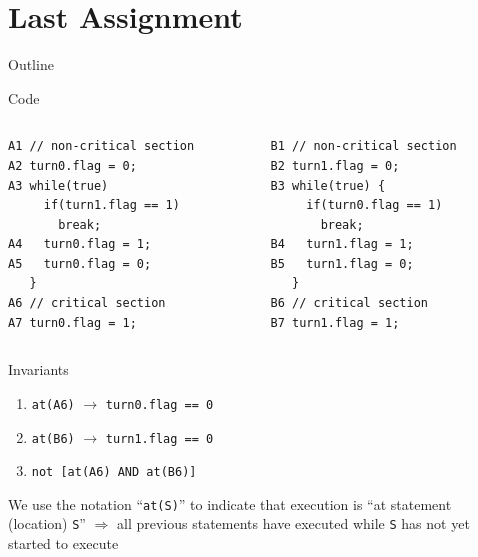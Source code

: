 \section{Last Assignment}

\begin{frame}{Outline}
  \tableofcontents[current]
\end{frame}

\begin{frame}[fragile]{Code}
  \begin{columns}[c]
    \begin{column}{0.50\textwidth}
\begin{lstlisting}[basicstyle=\fontsize{9}{11}\selectfont\ttfamily]
A1 // non-critical section
A2 turn0.flag = 0;
A3 while(true)
     if(turn1.flag == 1) 
       break;
A4   turn0.flag = 1;
A5   turn0.flag = 0;
   }
A6 // critical section
A7 turn0.flag = 1;
\end{lstlisting}
    \end{column}
    \begin{column}{0.50\textwidth}
\begin{lstlisting}[basicstyle=\fontsize{9}{11}\selectfont\ttfamily]
B1 // non-critical section
B2 turn1.flag = 0;
B3 while(true) {
     if(turn0.flag == 1) 
       break;
B4   turn1.flag = 1;
B5   turn1.flag = 0;
   }
B6 // critical section
B7 turn1.flag = 1;
\end{lstlisting}
    \end{column}
  \end{columns}
\end{frame}

\begin{frame}[fragile]{Invariants}
  \begin{enumerate}
  \item \lstinline!at(A6)! $\rightarrow$ \lstinline!turn0.flag == 0!
  \item \lstinline!at(B6)! $\rightarrow$ \lstinline!turn1.flag == 0!
  \item \lstinline!not [at(A6) AND at(B6)]!
  \end{enumerate}


  We use the notation ``\lstinline!at(S)!'' to indicate that execution
  is ``at statement (location) \lstinline!S!'' $\Rightarrow$ all
  previous statements have executed while \lstinline!S! has not yet
  started to execute
\end{frame}

